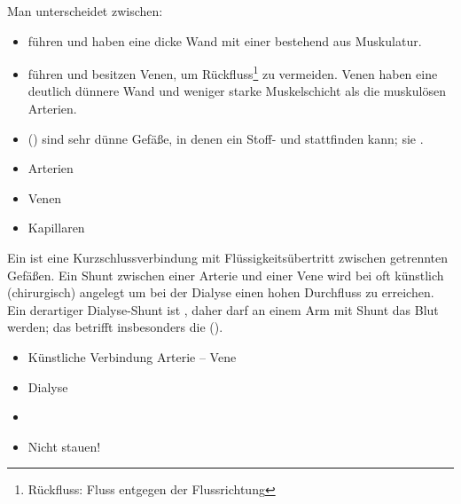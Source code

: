 {
Man unterscheidet zwischen:

\begin{itemize}
    \item {} führen  und
    haben eine dicke
    Wand mit einer  
    bestehend aus  Muskulatur. 
    \item {} führen  und
    besitzen Venen, um Rückfluss\footnote{Rückfluss:
    Fluss entgegen der Flussrichtung} zu vermeiden.     
    Venen haben eine deutlich dünn\-ere Wand 
    und weniger starke Muskelschicht 
    als die muskulösen Arterien.     
    \item {} () sind sehr dünne Gefäße,
    in denen ein Stoff- und  stattfinden kann; 
    sie . 
\end{itemize}
}
{
\begin{itemize}
  \item Arterien
  \item Venen
  \item Kapillaren
\end{itemize}
}{}{}{}

{%
\label{topic:shunt}
Ein    ist eine Kurzschlussverbindung mit Flüssigkeitsübertritt zwischen getrennten Gefäßen. 
Ein Shunt zwischen einer Arterie und einer Vene wird 
bei  
oft künstlich (chirurgisch) angelegt 
um bei der Dialyse einen hohen Durchfluss zu erreichen.%
Ein derartiger Dialyse-Shunt ist , 
daher darf an einem Arm mit Shunt das Blut  werden; 
das betrifft insbesonders die  
().
%
}{%
\begin{itemize}
  \item Künstliche Verbindung Arterie -- Vene
  \item Dialyse
  \item {}
  \item Nicht stauen!
\end{itemize}
}{}{}{}





